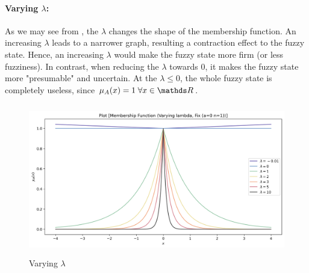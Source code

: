 \documentclass{tron}
\begin{document}
\clearpage
\paragraph{Varying $\lambda$:}
As we may see from , the $\lambda$ changes the shape of the membership function. An increasing $\lambda$ leads to a narrower graph, resulting a contraction effect to the fuzzy state. Hence, an increasing $\lambda$ would make the fuzzy state more firm (or less fuzziness). In contrast, when reducing the $\lambda$ towards 0, it makes the fuzzy state more "presumable" and uncertain. At the $\lambda \leq 0$, the whole fuzzy state is completely useless, since $\mu_A(x) = 1 \; \forall x\in \RR$.
\begin{figure}[H]
	\centering
	\includegraphics[height=250px]{../src_code/output/P5/plot_Membership Function (Varying lambda, Fix (a=0 n=1))}
	\caption{Varying $\lambda$}
	\label{fig:p5:lambda}
\end{figure}

\clearpage
\end{document}

